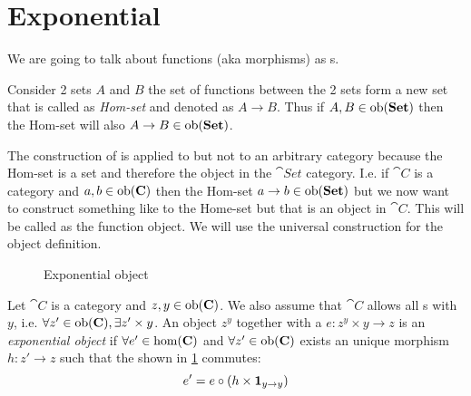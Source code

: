 \section{Exponential}
We are going to talk about functions (aka morphisms) as
s. 

\begin{example}
\label{ex:homset}
Consider 2 sets $A$ and $B$ the set of functions between the 2 sets
form a new set that is called as \textit{Hom-set} and denoted as $A
\to B$. Thus if $A,B \in \mathrm{ob}(\mathbf{Set})$ then the Hom-set will also $A
\to B \in \mathrm{ob}(\mathbf{Set})$. 
\end{example}

The construction of  is applied to
 but not to an arbitrary category because
the Hom-set is a set and therefore the object in the $\cat{Set}$
category. I.e. if $\cat{C}$ is a category and $a, b \in \mathrm{ob}(\mathbf{C})$
then the Hom-set $a \to b \in \mathrm{ob}(\mathbf{Set})$ but we now want to
construct something like to the Home-set but that is an object in
$\cat{C}$. This will be called as the function object. We will use the
universal construction for the object definition.

\begin{definition}[Exponential]
\label{def:exponential}
\begin{figure}
  \centering
  \caption{Exponential object}
  \label{fig:exponential}
\end{figure}
Let $\cat{C}$ is a category and $z, y \in \mathrm{ob}(\mathbf{C})$. We also assume
that $\cat{C}$ allows all s with $y$, i.e.
$\forall z' \in \mathrm{ob}(\mathbf{C}), \exists z' \times y$. An object $z^y$
together with a  $e: z^y \times y \to z$ is 
an \textit{exponential object} if $\forall e' \in \mathrm{hom}(\mathbf{C})$ and
$\forall z' \in \mathrm{ob}(\mathbf{C})$ exists an
unique morphism $h: z' \to z$ such that the
 shown in \cref{fig:exponential}
commutes:
\[
e' = e \circ \left(h \times \mathbf{1}_{ y \to y } \right)
\]
\end{definition}

